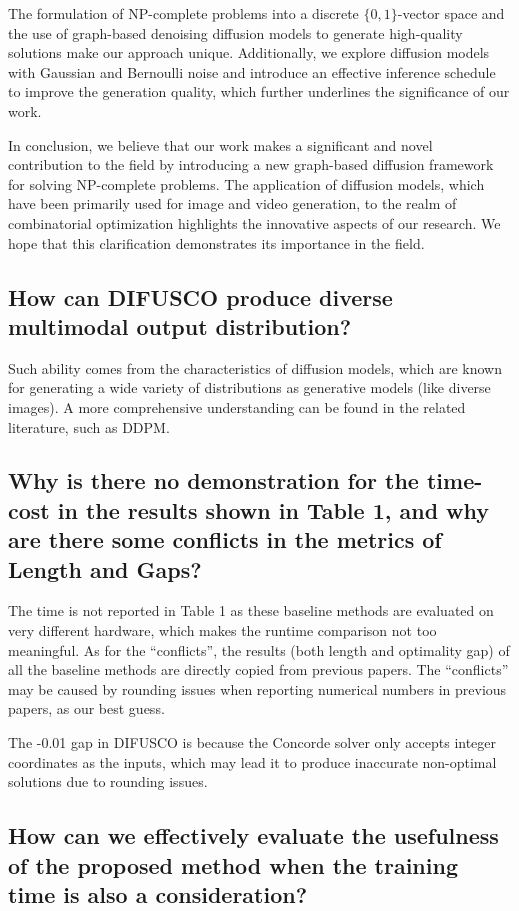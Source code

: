 The formulation of NP-complete problems into a discrete $\{0, 1\}$-vector space and the use of graph-based denoising diffusion models to generate high-quality solutions make our approach unique. Additionally, we explore diffusion models with Gaussian and Bernoulli noise and introduce an effective inference schedule to improve the generation quality, which further underlines the significance of our work.

In conclusion, we believe that our work makes a significant and novel contribution to the field by introducing a new graph-based diffusion framework for solving NP-complete problems. The application of diffusion models, which have been primarily used for image and video generation, to the realm of combinatorial optimization highlights the innovative aspects of our research. We hope that this clarification demonstrates its importance in the field.

\subsection{How can DIFUSCO produce diverse multimodal output distribution?}

Such ability comes from the characteristics of diffusion models, which are known for generating a wide variety of distributions as generative models (like diverse images). A more comprehensive understanding can be found in the related literature, such as DDPM.

\subsection{Why is there no demonstration for the time-cost in the results shown in Table 1, and why are there some conflicts in the metrics of Length and Gaps?}

The time is not reported in Table 1 as these baseline methods are evaluated on very different hardware, which makes the runtime comparison not too meaningful. As for the “conflicts”, the results (both length and optimality gap) of all the baseline methods are directly copied from previous papers. The “conflicts” may be caused by rounding issues when reporting numerical numbers in previous papers, as our best guess.

The -0.01 gap in DIFUSCO is because the Concorde solver only accepts integer coordinates as the inputs, which may lead it to produce inaccurate non-optimal solutions due to rounding issues.

\subsection{How can we effectively evaluate the usefulness of the proposed method when the training time is also a consideration?}

